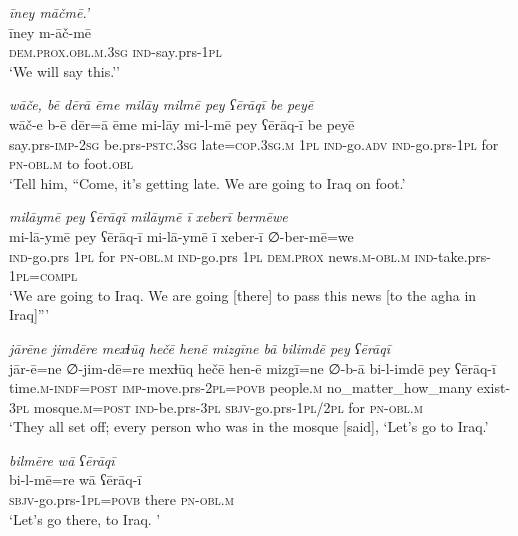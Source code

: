 \ea \label{BP.69}
\textit{īney māčmē.’} \\ 
\gll īney m-āč-mē \\ 
 \textsc{dem.prox}\textsc{.obl}\textsc{.m}\textsc{.3sg} \textsc{ind-}say.prs\textsc{-\textsc{1pl}} \\ 
\glt `We will say this.’'
\z 
 
\ea \label{BP.78}
\textit{wāče, bē dērā ēme milāy milmē pey ʕērāqī be peyē} \\ 
\gll wāč-e b-ē dēr=ā ēme mi-lāy mi-l-mē pey ʕērāq-ī be peyē \\ 
 say.prs-\textsc{imp-}\textsc{2sg} be.prs\textsc{-pstc}\textsc{.3sg} late\textsc{=cop}\textsc{.3sg}\textsc{.m} \textsc{1pl} \textsc{ind-}go\textsc{.adv} \textsc{ind-}go.prs\textsc{-\textsc{1pl}} for \textsc{pn}\textsc{-obl}\textsc{.m} to foot\textsc{.obl} \\ 
\glt `Tell him, “Come, it’s getting late. We are going to Iraq on foot.'
\z 
 
\ea \label{BP.79}
\textit{milāymē pey ʕērāqī milāymē ī xeberī bermēwe} \\ 
\gll mi-lā-ymē pey ʕērāq-ī mi-lā-ymē ī xeber-ī ∅-ber-mē=we \\ 
 \textsc{ind-}go.prs \textsc{1pl} for \textsc{pn}\textsc{-obl}\textsc{.m} \textsc{ind-}go.prs \textsc{1pl} \textsc{dem.prox} news\textsc{.m}\textsc{-obl}\textsc{.m} \textsc{ind-}take.prs\textsc{-\textsc{1pl}}\textsc{=compl} \\ 
\glt `We are going to Iraq. We are going [there] to pass this news [to the agha in Iraq]”'
\z 
 
\ea \label{BP.87}
\textit{jārēne jimdēre mexɫūq hečē henē mizgīne bā bilimdē pey ʕērāqī} \\ 
\gll jār-ē=ne ∅-jim-dē=re mexɫūq hečē hen-ē mizgī=ne ∅-b-ā bi-l-imdē pey ʕērāq-ī \\ 
 time\textsc{.m}\textsc{-indf}\textsc{=\textsc{post}} \textsc{imp-}move.prs-\textsc{2pl}\textsc{=\textsc{povb}} people\textsc{.m} no\_matter\_how\_many exist\textsc{-3pl} mosque\textsc{.m}\textsc{=\textsc{post}} \textsc{ind-}be.prs\textsc{-3pl} \textsc{sbjv-}go.prs\textsc{-\textsc{1pl}}/\textsc{2pl} for \textsc{pn}\textsc{-obl}\textsc{.m} \\ 
\glt `They all set off; every person who was in the mosque [said], ‘Let’s go to Iraq.'
\z 
 
\ea \label{BP.88}
\textit{bilmēre wā ʕērāqī} \\ 
\gll bi-l-mē=re wā ʕērāq-ī \\ 
 \textsc{sbjv-}go.prs\textsc{-\textsc{1pl}}\textsc{=\textsc{povb}} there \textsc{pn}\textsc{-obl}\textsc{.m} \\ 
\glt `Let’s go there, to Iraq. '
\z 
 
